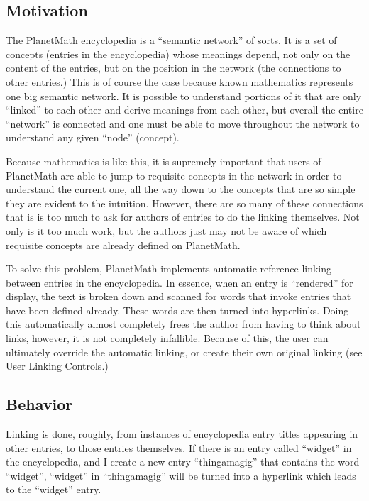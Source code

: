 
\subsection*{Motivation}
The PlanetMath encyclopedia is a ``semantic network'' of sorts. It is a set of concepts (entries in the encyclopedia) whose meanings depend, not only on the content of the entries, but on the position in the network (the connections to other entries.) This is of course the case because known mathematics represents one big semantic network. It is possible to understand portions of it that are only ``linked'' to each other and derive meanings from each other, but overall the entire ``network'' is connected and one must be able to move throughout the network to understand any given ``node'' (concept).

Because mathematics is like this, it is supremely important that users of PlanetMath are able to jump to requisite concepts in the network in order to understand the current one, all the way down to the concepts that are so simple they are evident to the intuition. However, there are so many of these connections that is is too much to ask for authors of entries to do the linking themselves. Not only is it too much work, but the authors just may not be aware of which requisite concepts are already defined on PlanetMath.

To solve this problem, PlanetMath implements automatic reference linking between entries in the encyclopedia. In essence, when an entry is ``rendered'' for display, the text is broken down and scanned for words that invoke entries that have been defined already. These words are then turned into hyperlinks. Doing this automatically almost completely frees the author from having to think about links, however, it is not completely infallible. Because of this, the user can ultimately override the automatic linking, or create their own original linking (see User Linking Controls.)

\subsection*{Behavior}
Linking is done, roughly, from instances of encyclopedia entry titles appearing in other entries, to those entries themselves. If there is an entry called ``widget'' in the encyclopedia, and I create a new entry ``thingamagig'' that contains the word ``widget'', ``widget'' in ``thingamagig'' will be turned into a hyperlink which leads to the ``widget'' entry.

